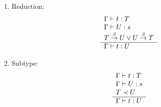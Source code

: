 \begin{definition}
\begin{enumerate}
\begin{enumerate}
        \item Reduction:
            $$
            \begin{array}{l} 
                \Gamma \vdash t: T
                \\
                \Gamma \vdash U: s
                \\
                T \stackrel{\beta}{\to} U \lor U \stackrel{\beta}{\to} T
             \\ \hline 
                \Gamma \vdash t: U
            \end{array}
            $$

        \item Subtype:
            $$
            \begin{array}{l} 
                \Gamma \vdash t: T
                \\
                \Gamma \vdash U: s
                \\
                T \prec U
             \\ \hline 
                \Gamma \vdash t: U
            \end{array}
            $$
        \end{enumerate}

    \end{enumerate}
\end{definition}
